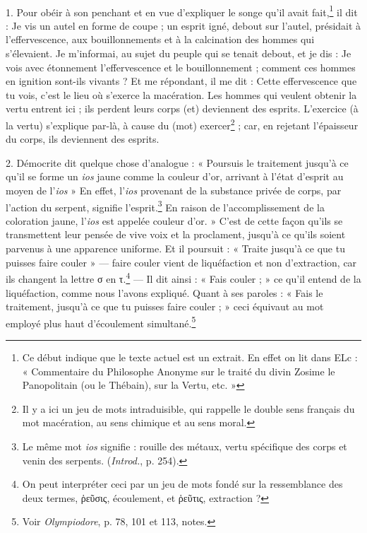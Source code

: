 \documentclass[landscape, a4paper, 11pt, oneside, polutonikogreek, french]{article}
\begin{document}
\paragraph{}
1. Pour obéir à son penchant et en vue d'expliquer le songe qu'il avait fait,\footnote{Ce début indique que le texte actuel est un extrait. En effet on lit dans ELc : « Commentaire du Philosophe Anonyme sur le traité du divin Zosime le Panopolitain (ou le Thébain), sur la Vertu, etc. »} il dit : Je vis un autel en forme de coupe ; un esprit igné, debout sur l'autel, présidait à l'effervescence, aux bouillonnements et à la calcination des hommes qui s'élevaient. Je m'informai, au sujet du peuple qui se tenait debout, et je dis : Je vois avec étonnement l'effervescence et le bouillonnement ; comment ces hommes en ignition sont-ils vivants ? Et me répondant, il me dit : Cette effervescence que tu vois, c'est le lieu où s'exerce la macération. Les hommes qui veulent obtenir la vertu entrent ici ; ils perdent leurs corps (et) deviennent des esprits. L'exercice (à la vertu) s'explique par-là, à cause du (mot) exercer\footnote{Il y a ici un jeu de mots intraduisible, qui rappelle le double sens français du mot macération, au sens chimique et au sens moral.} ; car, en rejetant l'épaisseur du corps, ils deviennent des esprits.

2. Démocrite dit quelque chose d'analogue : « Poursuis le traitement jusqu'à ce qu'il se forme un \emph{ios} jaune comme la couleur d'or, arrivant à l'état d'esprit au moyen de l'\emph{ios} » En effet, l'\emph{ios} provenant de la substance privée de corps, par l'action du serpent, signifie l'esprit.\footnote{Le même mot \emph{ios} signifie : rouille des métaux, vertu spécifique des corps et venin des serpents. (\emph{Introd.}, p. 254).} En raison de l'accomplissement de la coloration jaune, l'\emph{ios} est appelée couleur d'or. » C'est de cette façon qu'ils se transmettent leur pensée de vive voix et la proclament, jusqu'à ce qu'ils soient parvenus à une apparence uniforme. Et il poursuit : « Traite jusqu'à ce que tu puisses faire couler » --- faire couler vient de liquéfaction et non d'extraction, car ils changent la lettre σ en τ.\footnote{On peut interpréter ceci par un jeu de mots fondé sur la ressemblance des deux termes, ῥεῦσις, écoulement, et ῥεῦτις, extraction ?} --- Il dit ainsi : « Fais couler ; » ce qu'il entend de la liquéfaction, comme nous l'avons expliqué. Quant à ses paroles : « Fais le traitement, jusqu'à ce que tu puisses faire couler ; » ceci équivaut au mot employé plus haut d'écoulement simultané.\footnote{Voir \emph{Olympiodore}, p. 78, 101 et 113, notes.}
\end{document}
